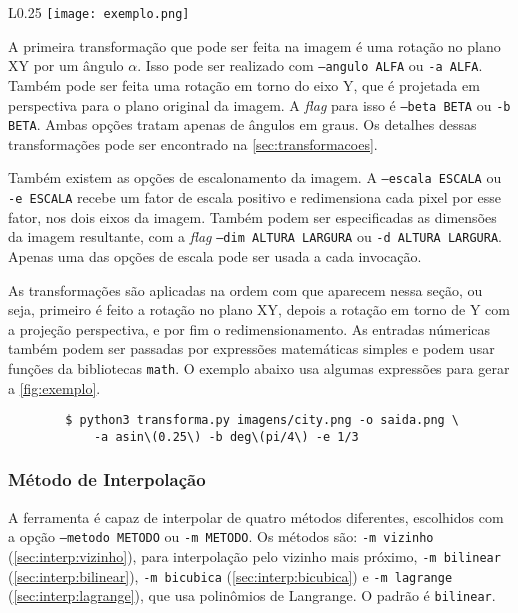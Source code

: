     \begin{wrapfigure}{L}{0.25\textwidth}
        \centering
        \texttt{[image: exemplo.png]}
        \caption{Exemplo de execução.}
        \label{fig:exemplo}
    \end{wrapfigure}

    A primeira transformação que pode ser feita na imagem é uma rotação no plano XY por um ângulo $\alpha$. Isso pode ser realizado com \texttt{--angulo ALFA} ou \texttt{-a ALFA}. Também pode ser feita uma rotação em torno do eixo Y, que é projetada em perspectiva para o plano original da imagem. A \textit{flag} para isso é \texttt{--beta BETA} ou \texttt{-b BETA}. Ambas opções tratam apenas de ângulos em graus. Os detalhes dessas transformações pode ser encontrado na \cref{sec:transformacoes}.


    Também existem as opções de escalonamento da imagem. A \texttt{--escala ESCALA} ou \texttt{-e ESCALA} recebe um fator de escala positivo e redimensiona cada pixel por esse fator, nos dois eixos da imagem. Também podem ser especificadas as dimensões da imagem resultante, com a \textit{flag} \texttt{--dim ALTURA LARGURA} ou \texttt{-d ALTURA LARGURA}. Apenas uma das opções de escala pode ser usada a cada invocação.

    As transformações são aplicadas na ordem com que aparecem nessa seção, ou seja, primeiro é feito a rotação no plano XY, depois a rotação em torno de Y com a projeção perspectiva, e por fim o redimensionamento. As entradas númericas também podem ser passadas por expressões matemáticas simples e podem usar funções da bibliotecas \texttt{math}. O exemplo abaixo usa algumas expressões para gerar a \cref{fig:exemplo}.

    \begin{verbatim}
        $ python3 transforma.py imagens/city.png -o saida.png \
            -a asin\(0.25\) -b deg\(pi/4\) -e 1/3
    \end{verbatim}

\subsubsection{Método de Interpolação}

    A ferramenta é capaz de interpolar de quatro métodos diferentes, escolhidos com a opção \texttt{--metodo METODO} ou \texttt{-m METODO}. Os métodos são: \texttt{-m vizinho} (\cref{sec:interp:vizinho}), para interpolação pelo vizinho mais próximo, \texttt{-m bilinear} (\ref{sec:interp:bilinear}), \texttt{-m bicubica} (\ref{sec:interp:bicubica}) e \texttt{-m lagrange} (\ref{sec:interp:lagrange}), que usa polinômios de Langrange. O padrão é \texttt{bilinear}.

